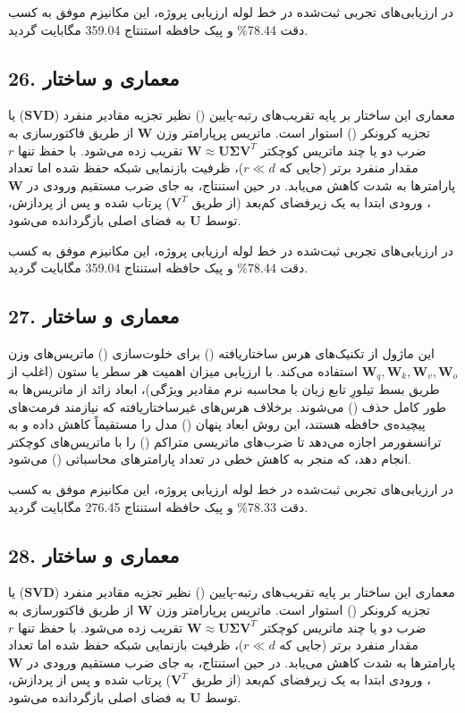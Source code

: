\documentclass[12pt,a4paper]{report}
\theoremstyle{definition}
\begin{document}
در ارزیابی‌های تجربی ثبت‌شده در خط لوله ارزیابی پروژه، این مکانیزم موفق به کسب دقت 78.44\% و پیک حافظه استنتاج 359.04 مگابایت گردید.

\subsection*{26. معماری و ساختار }
معماری این ساختار بر پایه تقریب‌های رتبه-پایین () نظیر تجزیه مقادیر منفرد ($\mathbf{SVD}$) یا تجزیه کرونکر () استوار است. ماتریس پرپارامتر وزن $\mathbf{W}$ از طریق فاکتورسازی به ضرب دو یا چند ماتریس کوچکتر $\mathbf{W} \approx \mathbf{U} \mathbf{\Sigma} \mathbf{V}^T$ تقریب زده می‌شود. با حفظ تنها $r$ مقدار منفرد برتر (جایی که $r \ll d$)، ظرفیت بازنمایی شبکه حفظ شده اما تعداد پارامترها به شدت کاهش می‌یابد. در حین استنتاج، به جای ضرب مستقیم ورودی در $\mathbf{W}$، ورودی ابتدا به یک زیرفضای کم‌بعد (از طریق $\mathbf{V}^T$) پرتاب شده و پس از پردازش، توسط $\mathbf{U}$ به فضای اصلی بازگردانده می‌شود.

در ارزیابی‌های تجربی ثبت‌شده در خط لوله ارزیابی پروژه، این مکانیزم موفق به کسب دقت 78.44\% و پیک حافظه استنتاج 359.04 مگابایت گردید.

\subsection*{27. معماری و ساختار }
این ماژول از تکنیک‌های هرس ساختاریافته () برای خلوت‌سازی () ماتریس‌های وزن $\mathbf{W}_q, \mathbf{W}_k, \mathbf{W}_v, \mathbf{W}_o$ استفاده می‌کند. با ارزیابی میزان اهمیت هر سطر یا ستون (اغلب از طریق بسط تیلورِ تابع زیان یا محاسبه نرم مقادیر ویژگی)، ابعاد زائد از ماتریس‌ها به طور کامل حذف () می‌شوند. برخلاف هرس‌های غیرساختاریافته که نیازمند فرمت‌های پیچیده‌ی حافظه هستند، این روش ابعاد پنهان () مدل را مستقیماً کاهش داده و به ترانسفورمر اجازه می‌دهد تا ضرب‌های ماتریسی متراکم () را با ماتریس‌های کوچکتر انجام دهد، که منجر به کاهش خطی در تعداد پارامترهای محاسباتی () می‌شود.

در ارزیابی‌های تجربی ثبت‌شده در خط لوله ارزیابی پروژه، این مکانیزم موفق به کسب دقت 78.33\% و پیک حافظه استنتاج 276.45 مگابایت گردید.

\subsection*{28. معماری و ساختار }
معماری این ساختار بر پایه تقریب‌های رتبه-پایین () نظیر تجزیه مقادیر منفرد ($\mathbf{SVD}$) یا تجزیه کرونکر () استوار است. ماتریس پرپارامتر وزن $\mathbf{W}$ از طریق فاکتورسازی به ضرب دو یا چند ماتریس کوچکتر $\mathbf{W} \approx \mathbf{U} \mathbf{\Sigma} \mathbf{V}^T$ تقریب زده می‌شود. با حفظ تنها $r$ مقدار منفرد برتر (جایی که $r \ll d$)، ظرفیت بازنمایی شبکه حفظ شده اما تعداد پارامترها به شدت کاهش می‌یابد. در حین استنتاج، به جای ضرب مستقیم ورودی در $\mathbf{W}$، ورودی ابتدا به یک زیرفضای کم‌بعد (از طریق $\mathbf{V}^T$) پرتاب شده و پس از پردازش، توسط $\mathbf{U}$ به فضای اصلی بازگردانده می‌شود.
\end{document}
